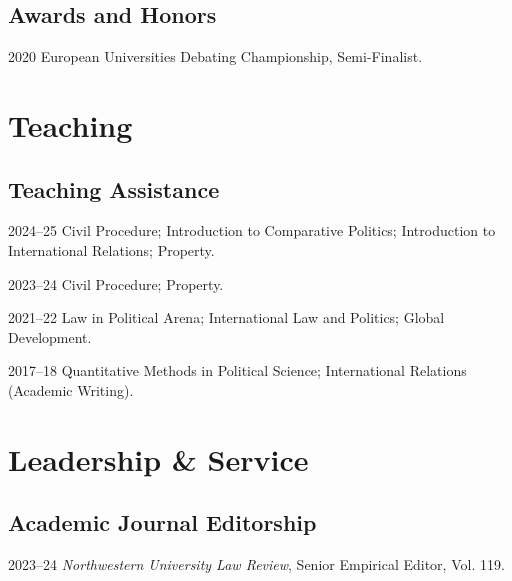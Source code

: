 \documentclass[11pt,letterpaper]{report}
\begin{document}
    \subsection*{Awards and Honors}

    \begin{tablist}

        \item[2020] \tab{}European Universities Debating Championship, Semi-Finalist. 
    \end{tablist}

    \section*{Teaching}

    \subsection*{Teaching Assistance}

    \begin{tablist}
        

        
        \item[2024--25]    \tab{}Civil Procedure; Introduction to Comparative Politics; Introduction to International Relations; Property.
        \item[2023--24]    \tab{}Civil Procedure; Property.
        \item[2021--22]    \tab{}Law in Political Arena; International Law and Politics; Global Development.
        \item[2017--18]    \tab{}Quantitative Methods in Political Science; International Relations (Academic Writing).

    \end{tablist}



    \section*{Leadership \& Service}



    \subsection*{Academic Journal Editorship}

    \begin{tablist}

        \item[2023--24]  \tab{}\textit{Northwestern University Law Review}, Senior Empirical Editor, Vol. 119. 


    \end{tablist}
\end{document}

